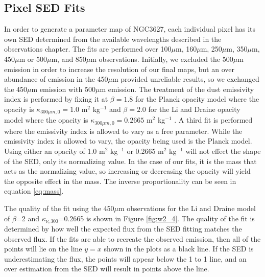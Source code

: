 \subsection{Pixel SED Fits}

In order to generate a parameter map of NGC3627, each individual pixel has its own SED determined from the available wavelengths described in the observations chapter.  The fits are performed over 100$\mu$m, 160$\mu$m, 250$\mu$m, 350$\mu$m, 450$\mu$m or 500$\mu$m, and 850$\mu$m observations.  Initially, we excluded the 500$\mu$m emission in order to increase the resolution of our final maps, but an over abundance of emission in the 450$\mu$m provided unreliable results, so we exchanged the 450$\mu$m emission with 500$\mu$m emission.  The treatment of the dust emissivity index is performed by fixing it at $\beta=1.8$ for the Planck opacity model where the opacity is $\kappa_{300\mu m,0}=1.0$ m$^2$ kg$^{-1}$ \citep{planckxxv2011} and $\beta=2.0$ for the Li and Draine opacity model where the opacity is $\kappa_{300\mu m,0}=0.2665$ m$^2$ kg$^{-1}$ \citep{li2001}.  A third fit is performed where the emissivity index is allowed to vary as a free parameter.  While the emissivity index is allowed to vary, the opacity being used is the Planck model.  Using either an opacity of 1.0 m$^2$ kg$^{-1}$ or 0.2665 m$^2$ kg$^{-1}$ will not effect the shape of the SED, only its normalizing value.  In the case of our fits, it is the mass that acts as the normalizing value, so increasing or decreasing the opacity will yield the opposite effect in the mass.  The inverse proportionality can be seen in equation \ref{eq:mass}.  

The quality of the fit using the 450$\mu$m observations for the Li and Draine model of $\beta$=2 and $\kappa_{\nu,300}$=0.2665 is shown in Figure \ref{fig:w2_4}.  The quality of the fit is determined by how well the expected flux from the SED fitting matches the observed flux.  If the fits are able to recreate the observed emission, then all of the points will lie on the line $y=x$ shown in the plots as a black line.  If the SED is underestimating the flux, the points will appear below the 1 to 1 line, and an over estimation from the SED will result in points above the line.  


